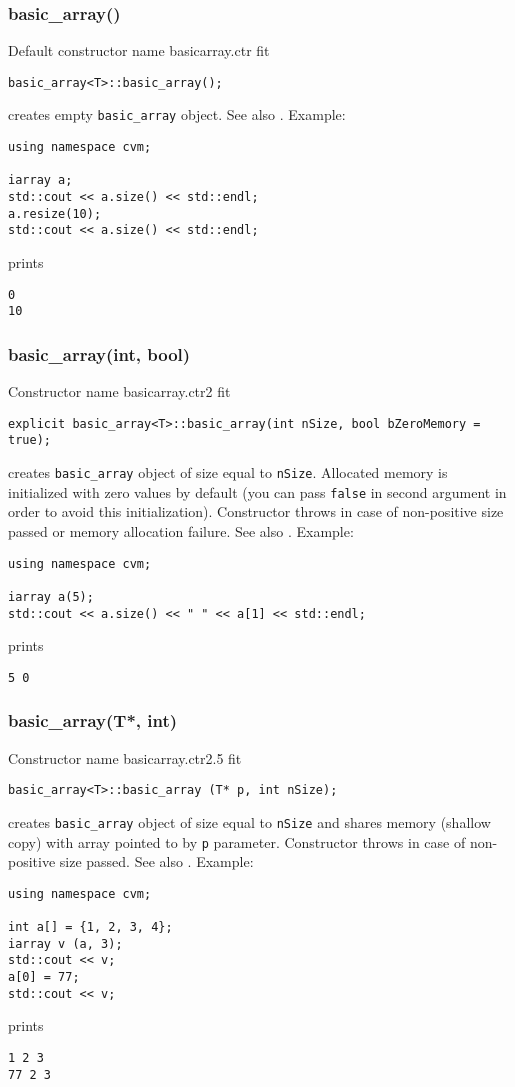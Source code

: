 \subsubsection{basic\_array()}
Default constructor%
\pdfdest name {basicarray.ctr} fit
\begin{verbatim}
basic_array<T>::basic_array();
\end{verbatim}
creates  empty \verb"basic_array" object. See also 
.
Example:
\begin{Verbatim}
using namespace cvm;

iarray a;
std::cout << a.size() << std::endl;
a.resize(10);
std::cout << a.size() << std::endl;
\end{Verbatim}
prints
\begin{Verbatim}
0
10
\end{Verbatim}
\newpage


\subsubsection{basic\_array(int, bool)}
Constructor%
\pdfdest name {basicarray.ctr2} fit
\begin{verbatim}
explicit basic_array<T>::basic_array(int nSize, bool bZeroMemory = true);
\end{verbatim}
creates  \verb"basic_array" object of size equal to \verb"nSize". 
Allocated memory is initialized with zero values by default 
(you can pass \verb"false" in second argument in order to 
avoid this initialization). 
Constructor throws 
in case of non-positive size passed or memory allocation failure.
See also
.
Example:
\begin{Verbatim}
using namespace cvm;

iarray a(5);
std::cout << a.size() << " " << a[1] << std::endl;
\end{Verbatim}
prints
\begin{Verbatim}
5 0
\end{Verbatim}
\newpage


\subsubsection{basic\_array(T*, int)}
Constructor%
\pdfdest name {basicarray.ctr2.5} fit
\begin{verbatim}
basic_array<T>::basic_array (T* p, int nSize);
\end{verbatim}
creates  \verb"basic_array" object of size equal to 
\verb"nSize" and shares memory (shallow copy) with array pointed to by \verb"p" parameter.
Constructor throws  
in case of non-positive size passed.
See also .
Example:
\begin{Verbatim}
using namespace cvm;

int a[] = {1, 2, 3, 4};
iarray v (a, 3);
std::cout << v;
a[0] = 77;
std::cout << v;
\end{Verbatim}
prints
\begin{Verbatim}
1 2 3
77 2 3
\end{Verbatim}
\newpage


